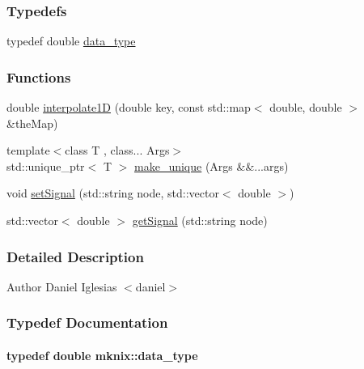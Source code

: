 \subsubsection*{Typedefs}
\begin{DoxyCompactItemize}
\item 
typedef double \hyperlink{namespacemknix_a16be4b246fbf2cceb141e3a179111020}{data\+\_\+type}
\end{DoxyCompactItemize}
\subsubsection*{Functions}
\begin{DoxyCompactItemize}
\item 
double \hyperlink{namespacemknix_a3c53b5663b9039ec67691eea93bb7f54}{interpolate1\+D} (double key, const std\+::map$<$ double, double $>$ \&the\+Map)
\item 
{\footnotesize template$<$class T , class... Args$>$ }\\std\+::unique\+\_\+ptr$<$ T $>$ \hyperlink{namespacemknix_a7635c8b68c992d53466bf5083e9c7ae2}{make\+\_\+unique} (Args \&\&...args)
\item 
void \hyperlink{namespacemknix_a8f5fd36c13ae99d02e930a9dad382721}{set\+Signal} (std\+::string node, std\+::vector$<$ double $>$)
\item 
std\+::vector$<$ double $>$ \hyperlink{namespacemknix_a191080c246e25b3b1cfbccbabbe50fcd}{get\+Signal} (std\+::string node)
\end{DoxyCompactItemize}


\subsubsection{Detailed Description}
\begin{DoxyAuthor}{Author}
Daniel Iglesias $<$daniel$>$ 
\end{DoxyAuthor}


\subsubsection{Typedef Documentation}
\hypertarget{namespacemknix_a16be4b246fbf2cceb141e3a179111020}{}
\paragraph[{data\+\_\+type}]{\setlength{\rightskip}{0pt plus 5cm}typedef double {\bf mknix\+::data\+\_\+type}}\label{namespacemknix_a16be4b246fbf2cceb141e3a179111020}


